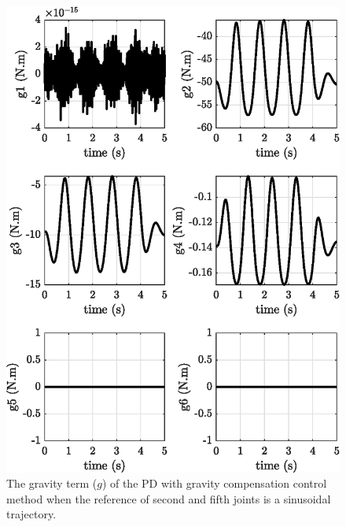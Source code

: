 \begin{figure}[H]
	\centering
	\includegraphics{images/act_1.6_sin/g.eps}
	\caption{The gravity term ($g$) of the PD with gravity compensation control method when the reference of second and fifth joints is a sinusoidal trajectory.}
	\label{fig:act_1.6_sin_g}
\end{figure}

